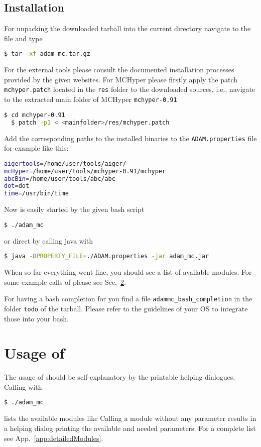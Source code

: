 \documentclass[12pt,twoside,a4paper,openright]{memoir}
\begin{document}
\section{Installation}
For unpacking the downloaded tarball into the current directory
navigate to the file and type
\begin{lstlisting}[language=bash]
  $ tar -xf adam_mc.tar.gz
\end{lstlisting}
For the external tools please consult the documented installation processes
provided by the given websites. For MCHyper please firstly apply the patch \texttt{mchyper.patch}
located in the \texttt{res} folder to the downloaded sources, i.e., navigate 
to the extracted main folder of MCHyper \texttt{mchyper-0.91}
\begin{lstlisting}[language=bash]
  $ cd mchyper-0.91
  $ patch -p1 < <mainfolder>/res/mchyper.patch 
\end{lstlisting}
Add the corresponding paths to the installed binaries to the \texttt{ADAM.properties} file
for example like this:
\begin{lstlisting}[language=bash]
aigertools=/home/user/tools/aiger/
mcHyper=/home/user/tools/mchyper-0.91/mchyper
abcBin=/home/user/tools/abc/abc
dot=dot
time=/usr/bin/time
\end{lstlisting}
Now \tool{} is easily started by the given bash script
\begin{lstlisting}[language=bash]
$ ./adam_mc
\end{lstlisting}
or direct by calling java with
\begin{lstlisting}[language=bash]
$ java -DPROPERTY_FILE=./ADAM.properties -jar adam_mc.jar
\end{lstlisting}
When so far everything went fine, you should see a list of available modules.
For some example calls of \tool{} please see Sec.~\ref{sec:usage}.

For having a bash completion for \tool{} you find a file \texttt{adammc\_bash\_completion}
in the folder \texttt{todo} of the tarball.
Please refer to the guidelines of your OS to integrate those into your bash. 

\chapter{Usage of \tool}
\label{sec:usage}
The usage of \tool{} should be self-explanatory by the printable helping dialogues.
Calling \tool{} with
\begin{lstlisting}[language=bash]
  $ ./adam_mc
\end{lstlisting}
lists the available modules like
Calling a module without any parameter results in a helping dialog printing 
the available and needed parameters. For a complete list see App.~\ref{app:detailedModules}.
\end{document}
